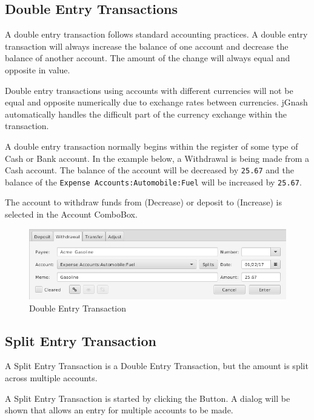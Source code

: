 \documentclass[letterpaper,12pt]{book}
\begin{document}
    \subsection{Double Entry Transactions}
    A double entry transaction follows standard accounting practices. A double entry transaction will always
    increase the balance of one account and decrease the balance of another account. The amount of the change will
    always equal and opposite in value.

    \begin{mdframed}[style=info]
        Double entry transactions using accounts with different currencies will not be equal and opposite numerically due
        to exchange rates between currencies. jGnash automatically handles the difficult part of the currency exchange
        within the transaction.
    \end{mdframed}

    A double entry transaction normally begins within the register of some type of Cash or Bank account.
    In the example below, a Withdrawal is being made from a Cash account. The balance of the account will be decreased
    by \texttt{25.67} and the balance of the \texttt{Expense Accounts:Automobile:Fuel} will be increased by \texttt{25.67}.

    The account to withdraw funds from (Decrease) or deposit to (Increase) is selected in the Account ComboBox.

    \begin{figure}[H]
        \caption{Double Entry Transaction}
        \includegraphics[width=0.9\linewidth]{images/basicDoubleEntry}
    \end{figure}

    \subsection{Split Entry Transaction}
    A Split Entry Transaction is a Double Entry Transaction, but the amount is split across multiple accounts.

    A Split Entry Transaction is started by clicking the  Button. A dialog will be shown that allows an entry
    for multiple accounts to be made.
\end{document}
